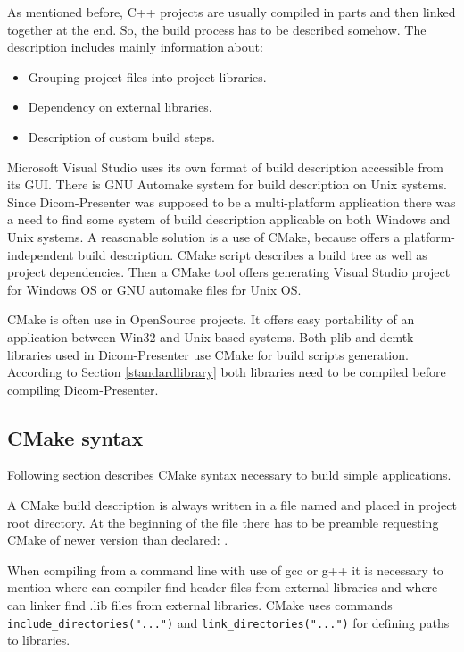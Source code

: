 As mentioned before, C++ projects are usually compiled in parts and then linked together at the end. So, the build process has to be described somehow. The description includes mainly information about:

\begin{itemize}
\item Grouping project files into project libraries.
\item Dependency on external libraries.
\item Description of custom build steps.
\end{itemize}

Microsoft Visual Studio uses its own format of build description accessible from its GUI. There is GNU Automake system for build description on Unix systems. Since Dicom-Presenter was supposed to be a multi-platform application there was a need to find some system of build description applicable on both Windows and Unix systems. A reasonable solution is a use of CMake, because offers a platform-independent build description. CMake script describes a build tree as well as project dependencies. Then a CMake tool offers generating Visual Studio project for Windows OS or GNU automake files for Unix OS.

CMake is often use in OpenSource projects. It offers easy portability of an application between Win32 and Unix based systems. Both plib and dcmtk libraries used in Dicom-Presenter use CMake for build scripts generation. According to Section \ref{standardlibrary} both libraries need to be compiled before compiling Dicom-Presenter.

\subsection{CMake syntax}


Following section describes CMake syntax necessary to build simple applications. 

A CMake build description is always written in a file named  and placed in project root directory. At the beginning of the file there has to be preamble requesting CMake of newer version than declared: .

When compiling from a command line with use of gcc or g++ it is necessary to mention where can compiler find header files from external libraries and where can linker find .lib files from external libraries. CMake uses commands \texttt{include\-\_directories\-("...")} and \texttt{link\-\_directories\-("...")} for defining paths to libraries.

